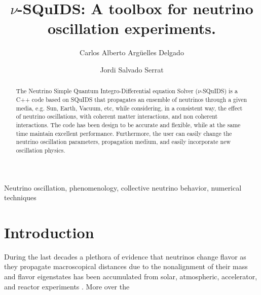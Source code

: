 \documentclass[3p,12pt,authoryear]{elsarticle}
\begin{document}
\begin{frontmatter}

\title{$\nu$-SQuIDS: A toolbox for neutrino oscillation experiments.}

\author[uw,wipac]{Carlos Alberto Arg\"uelles Delgado}
\author[uw,wipac]{Jordi Salvado Serrat}
\address[uw]{Department of Physics, University of Wisconsin, Madison, WI 53706, USA} 
\address[wipac]{Wisconsin IceCube Particle Astrophysics Center, Madison, WI 53703, USA}



\begin{abstract}
The Neutrino Simple Quantum Integro-Differential equation Solver ($\nu$-SQuIDS) is a C++ code based on SQuIDS that propagates an ensemble of neutrinos through a given media, e.g. Sun, Earth, Vacuum, etc, while considering, in a consistent way, the effect of neutrino oscillations, with coherent matter interactions, and non coherent interactions. The code has been design to be accurate and flexible, while at the same time maintain excellent performance. Furthermore, the user can easily change the neutrino oscillation parameters, propagation medium, and easily incorporate new oscillation physics. 
\end{abstract}

\begin{keyword}
Neutrino oscillation, phenomenology, collective neutrino behavior, numerical techniques
\end{keyword}

\end{frontmatter}

\hypersetup{linkcolor=black}
\tableofcontents
\hypersetup{linkcolor=blue}

\section{Introduction}
\label{sec:intro} 

During the last decades a plethora of evidence that neutrinos change flavor as they propagate macroscopical distances due to the nonalignment of their mass and flavor eigenstates has been accumulated from solar, atmospheric, accelerator, and reactor experiments \citep{Mohapatra:qv,Gouvea:2013fj}. More over the 
\end{document}
